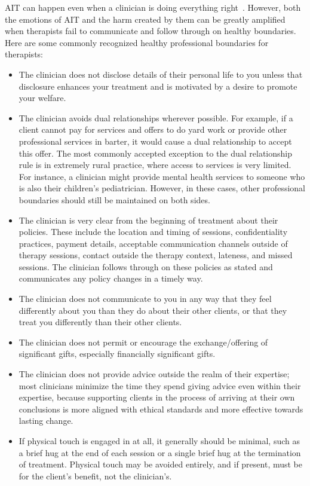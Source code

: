 \documentclass[11pt,oneside]{book}
\let\cite\parencite
\begin{document}
AIT can happen even when a clinician is doing everything right~\cite{transferranceLoveHarm}. However, both the emotions of AIT and the harm created by them can be greatly amplified when therapists fail to communicate and follow through on healthy boundaries. Here are some commonly recognized healthy professional boundaries for therapists:
\begin{itemize}
    \item The clinician does not disclose details of their personal life to you unless that disclosure enhances your treatment and is motivated by a desire to promote your welfare.
    \item The clinician avoids dual relationships wherever possible. For example, if a client cannot pay for services and offers to do yard work or provide other professional services in barter, it would cause a dual relationship to accept this offer. The most commonly accepted exception to the dual relationship rule is in extremely rural practice, where access to services is very limited. For instance, a clinician might provide mental health services to someone who is also their children's pediatrician. However, in these cases, other professional boundaries should still be maintained on both sides.
    \item The clinician is very clear from the beginning of treatment about their policies. These include the location and timing of sessions, confidentiality practices, payment details, acceptable communication channels outside of therapy sessions, contact outside the therapy context, lateness, and missed sessions. The clinician follows through on these policies as stated and communicates any policy changes in a timely way.
    \item The clinician does not communicate to you in any way that they feel differently about you than they do about their other clients, or that they treat you differently than their other clients.
    \item The clinician does not permit or encourage the exchange/offering of significant gifts, especially financially significant gifts.
    \item The clinician does not provide advice outside the realm of their expertise; most clinicians minimize the time they spend giving advice even within their expertise, because supporting clients in the process of arriving at their own conclusions is more aligned with ethical standards and more effective towards lasting change.
    \item If physical touch is engaged in at all, it generally should be minimal, such as a brief hug at the end of each session or a single brief hug at the termination of treatment. Physical touch may be avoided entirely, and if present, must be for the client's benefit, not the clinician's.

\end{itemize}
\end{document}
